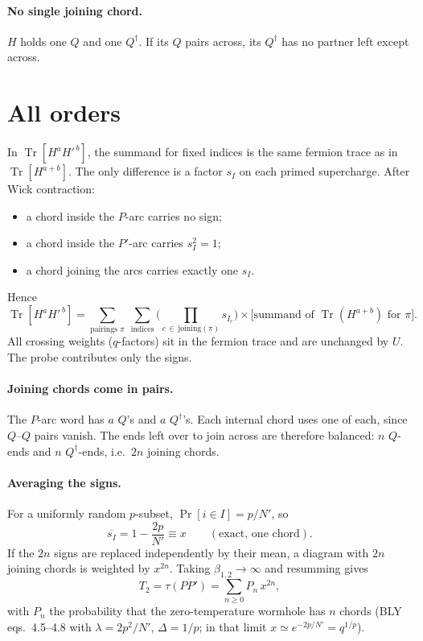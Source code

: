 \documentclass[11pt]{article}
\newcommand{\Tr}{\operatorname{Tr}}
\newcommand{\Np}{N'}
\begin{document}
\paragraph{No single joining chord.} $H$ holds one $Q$ and one $Q^\dagger$. If its $Q$ pairs across, its $Q^\dagger$
has no partner left except across.

\section{All orders}
In $\Tr[H^aH'^{\,b}]$, the summand for fixed indices is the same fermion trace as in $\Tr[H^{a+b}]$. The only
difference is a factor $s_I$ on each primed supercharge. After Wick contraction:
\begin{itemize}\itemsep1pt
\item a chord inside the $P$-arc carries no sign;
\item a chord inside the $P'$-arc carries $s_I^2=1$;
\item a chord joining the arcs carries exactly one $s_I$.
\end{itemize}
Hence
\begin{equation}
\Tr[H^a H'^{\,b}]=\sum_{\text{pairings }\pi}\ \sum_{\text{indices}}\Big(\prod_{c\,\in\,\text{joining}(\pi)}s_{I_c}\Big)\times
\big[\text{summand of }\Tr(H^{a+b})\text{ for }\pi\big].
\end{equation}
All crossing weights ($q$-factors) sit in the fermion trace and are unchanged by $U$. The probe contributes only
the signs.

\paragraph{Joining chords come in pairs.} The $P$-arc word has $a$ $Q$'s and $a$ $Q^\dagger$'s. Each internal chord
uses one of each, since $Q$--$Q$ pairs vanish. The ends left over to join across are therefore balanced: $n$ $Q$-ends
and $n$ $Q^\dagger$-ends, i.e.\ $2n$ joining chords.

\paragraph{Averaging the signs.} For a uniformly random $p$-subset, $\Pr[i\in I]=p/\Np$, so
\begin{equation}
\overline{s_I}=1-\frac{2p}{\Np}\equiv x\qquad(\text{exact, one chord}).
\end{equation}
If the $2n$ signs are replaced independently by their mean, a diagram with $2n$ joining chords is weighted by $x^{2n}$.
Taking $\beta_{1,2}\to\infty$ and resumming gives
\begin{equation}
T_2=\tau(PP')=\sum_{n\ge0}P_n\,x^{2n},
\end{equation}
with $P_n$ the probability that the zero-temperature wormhole has $n$ chords (BLY eqs.~4.5--4.8 with $\lambda=2p^2/\Np$,
$\Delta=1/p$; in that limit $x\simeq e^{-2p/\Np}=q^{1/p}$).
\end{document}
